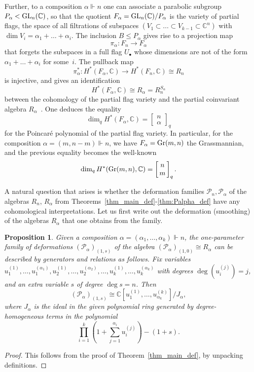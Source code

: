 \documentclass[a4paper,11pt]{amsart}
\theoremstyle{plain}
\newtheorem{proposition}[theorem]{Proposition}
\theoremstyle{definition}
\newcommand{\C}{\mathbb{C}}
\newcommand{\CP}{\mathscr{P}}
\begin{document}
Further, to a composition $\alpha\Vdash n$ one can associate a parabolic subgroup $P_\alpha <{\rm GL}_n(\C)$, so that the quotient
$F_\alpha={\rm GL}_n(\C)/P_\alpha$ is the variety of partial flags, the space of all filtrations of subspaces $(V_1\subset\ldots \subset V_{k-1} \subset \C^n)$ with $\dim V_i = \alpha_1+\ldots + \alpha_i$. The inclusion $B\leq P_\alpha$ gives rise to a projection map
\[ \pi_\alpha\colon F_n \to F_\alpha\]
that forgets the subspaces in a full flag $U_\bullet$ whose dimensions are not of the form $\alpha_1+\ldots + \alpha_i$ for some~$i$. The pullback map
\[ \pi_\alpha^*\colon H^*(F_\alpha,\C) \to H^*(F_n,\C)\cong R_n \]
is injective, and gives an identification 
\[
H^*(F_\alpha,\C) \cong R_\alpha = R_n^{S_\alpha}
\]
between the cohomology of the partial flag variety and the partial coinvariant algebra $R_\alpha$~\cite[Cor.~5.4, Thm.~5.5]{BGG}. One deduces the equality
\[
\dim_{q}H^*(F_\alpha, \C) = \left[\!\!\begin{array}{c}n\\\alpha\end{array}\!\!\right]_q
\]
for the Poincar\'e polynomial of the partial flag variety. In particular, for the composition $\alpha =(m,n-m)\Vdash n$, we have 
$F_\alpha = {\rm Gr}(m,n)$ the Grassmannian, and the previous equality becomes the well-known
\[
\dim_{q}H^*({\rm Gr}(m,n), \C) = \left[\!\!\begin{array}{c}n\\ m \end{array}\!\!\right]_q. 
\]

A natural question that arises is whether the deformation families $\CP_n, \CP_\alpha$ of the algebras $R_n$, $R_\alpha$ from Theorems~\ref{thm_main_def}-\ref{thm:Palpha_def} have any cohomological interpretations. Let us first write out the deformation (smoothing) of the algebras $R_\alpha$ that one obtains from the family.  

\begin{proposition}\label{prop:cohom}
Given a composition $\alpha=(\alpha_1,\ldots, \alpha_k)\Vdash n$, the one-parameter family of deformations $(\CP_\alpha)_{(1,s)}$ of the
algebra $(\CP_\alpha)_{(1,0)}\cong R_\alpha$ can be described by generators and relations as follows.
Fix variables $u_1^{(1)},\ldots, u_{1}^{(\alpha_1)}, u_2^{(1)}, \ldots, u_{2}^{(\alpha_2)}, \ldots, u_k^{(1)}, \ldots, u_k^{({\alpha_k})}$ with degrees $\deg\left(u_i^{(j)}\right)=j$, and
an extra variable $s$ of degree $\deg s=n$. Then
\[ (\CP_\alpha)_{(1,s)} \cong \C\left[u_1^{(1)}, \ldots,  u_{\alpha_k}^{(k)}\right]\Big/ J_\alpha, 
\] 
where $J_\alpha$ is the ideal in the given polynomial ring generated by degree-homogeneous terms in the polynomial 
\[ \prod_{i=1}^k \left(1+\sum_{j=1}^{\alpha_i} u_i^{(j)}\right)-(1+s).\]
\end{proposition}
\begin{proof} This follows from the proof of Theorem~\ref{thm_main_def}, by unpacking definitions. 
\end{proof} 
\end{document}

